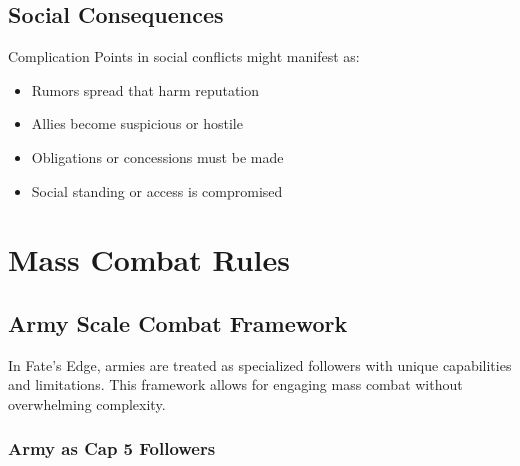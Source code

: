 \subsection{Social Consequences}
Complication Points in social conflicts might manifest as:
\begin{itemize}
\item Rumors spread that harm reputation
\item Allies become suspicious or hostile
\item Obligations or concessions must be made
\item Social standing or access is compromised
\end{itemize}

\section{Mass Combat Rules}

\subsection{Army Scale Combat Framework}

In Fate's Edge, armies are treated as specialized followers with unique capabilities and limitations. This framework allows for engaging mass combat without overwhelming complexity.

\subsubsection{Army as Cap 5 Followers}

